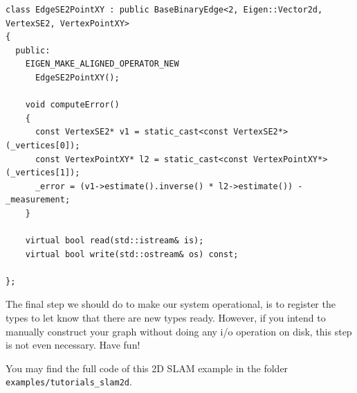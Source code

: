 \documentclass[a4paper]{article}
\begin{document}
\begin{lstlisting}[float,label=lst:edgese2xy,caption=Edge connecting a
  robot poses and a landmark.]
class EdgeSE2PointXY : public BaseBinaryEdge<2, Eigen::Vector2d, VertexSE2, VertexPointXY>
{
  public:
    EIGEN_MAKE_ALIGNED_OPERATOR_NEW
      EdgeSE2PointXY();

    void computeError()
    {
      const VertexSE2* v1 = static_cast<const VertexSE2*>(_vertices[0]);
      const VertexPointXY* l2 = static_cast<const VertexPointXY*>(_vertices[1]);
      _error = (v1->estimate().inverse() * l2->estimate()) - _measurement;
    }

    virtual bool read(std::istream& is);
    virtual bool write(std::ostream& os) const;

};
\end{lstlisting}
The final step we should do to make our system operational, is to
register the types to let \gopt{} know that there are new types ready.
However, if you intend to manually construct your graph without doing
any i/o operation on disk, this step is not even necessary. Have fun!

You may find the full code of this 2D SLAM example in the folder
\texttt{examples/tutorials\_slam2d}.

{\small

}
\end{document}
